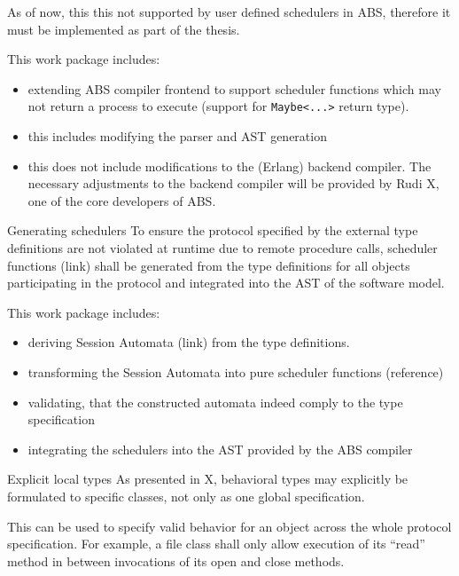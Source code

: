 \documentclass[paper=a4,nochapname,accentcolor=tud9c]{tudexercise}
\makeatletter
\def\namedlabel#1#2{\begingroup
    #1%
    \def\@currentlabel{\thedescriptcount}%
    \phantomsection\label{#2}\endgroup
}
\newcounter{descriptcount}
\renewcommand*\thedescriptcount{[\Alph{descriptcount}]}}
\renewcommand*\thedescriptcount{\roman{descriptcount}}}
\makeatother
\begin{document}
\begin{enumdescript}
    As of now, this this not supported by user defined schedulers in ABS,
    therefore it must be implemented as part of the thesis.

    This work package includes:
    \begin{itemize}
      \item extending ABS compiler frontend to support scheduler functions which
        may not return a process to execute (support for \texttt{Maybe<...>}
        return type).
        \item this includes modifying the parser and AST generation
        \item this does not include modifications to the (Erlang) backend
          compiler. The necessary adjustments to the backend compiler will be
          provided by Rudi X, one of the core developers of ABS.
    \end{itemize}
  \item[\namedlabel{Generating schedulers}{WPGenSchedulers}]%
    To ensure the protocol specified by the external type definitions are not
    violated at runtime due to remote procedure calls, scheduler functions (link)
    shall be generated from the type definitions for all objects participating
    in the protocol and integrated into the AST of the software model.

    This work package includes:
    \begin{itemize}
      \item deriving Session Automata (link) from the type definitions.
      \item transforming the Session Automata into pure scheduler functions (reference)
      \item validating, that the constructed automata indeed comply to the
        type specification
      \item integrating the schedulers into the AST provided by the ABS compiler
    \end{itemize}
  \item[\namedlabel{Explicit local types}{WPExplicitTypes}]%
    As presented in X, behavioral types may explicitly be formulated to specific
    classes, not only as one global specification.

    This can be used to specify valid behavior for an object across the whole
    protocol specification. For example, a file class shall only allow execution
    of its ``read'' method in between invocations of its open and close methods.


\end{enumdescript}
\end{document}
